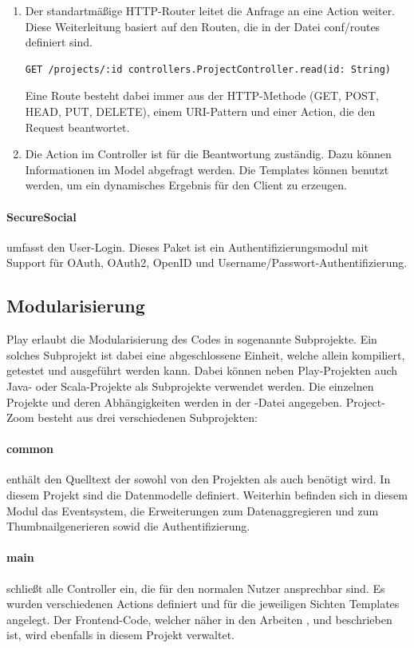 \begin{enumerate}
  \item Der standartmäßige HTTP-Router leitet die Anfrage an eine Action weiter. Diese Weiterleitung basiert auf den Routen, die in der Datei conf/routes definiert sind.
\begin{lstlisting}
GET /projects/:id controllers.ProjectController.read(id: String)
\end{lstlisting}
Eine Route besteht dabei immer aus der HTTP-Methode (GET, POST, HEAD, PUT, DELETE)\cite{play-scala-routing}, einem URI-Pattern und einer Action, die den Request beantwortet.
\item Die Action im Controller ist für die Beantwortung zuständig. Dazu können Informationen im Model abgefragt werden. Die Templates können benutzt werden, um ein dynamisches Ergebnis für den Client zu erzeugen.
\end{enumerate}

\paragraph{SecureSocial} umfasst den User-Login. Dieses Paket ist ein Authentifizierungsmodul mit Support für OAuth, OAuth2, OpenID und Username/Passwort-Authentifizierung. 

\subsection{Modularisierung}
Play erlaubt die Modularisierung des Codes in sogenannte Subprojekte. Ein solches Subprojekt ist dabei eine abgeschlossene Einheit, welche allein kompiliert, getestet und ausgeführt werden kann. Dabei können neben Play-Projekten auch Java- oder Scala-Projekte als Subprojekte verwendet werden. Die einzelnen Projekte und deren Abhängigkeiten werden in der -Datei angegeben.
Project-Zoom besteht aus drei verschiedenen Subprojekten:

\paragraph{common} enthält den Quelltext der sowohl von den Projekten  als auch  benötigt wird. In diesem Projekt sind die Datenmodelle definiert. Weiterhin befinden sich in diesem Modul das Eventsystem, die Erweiterungen zum Datenaggregieren und zum Thumbnailgenerieren sowid die Authentifizierung.

\paragraph{main} schließt alle Controller ein, die für den normalen Nutzer ansprechbar sind. Es wurden verschiedenen Actions definiert und für die jeweiligen Sichten Templates angelegt. Der Frontend-Code, welcher näher in den Arbeiten \cite{bp-norman}, \cite{bp-tomh} und \cite{bp-anita} beschrieben ist, wird ebenfalls in diesem Projekt verwaltet.

